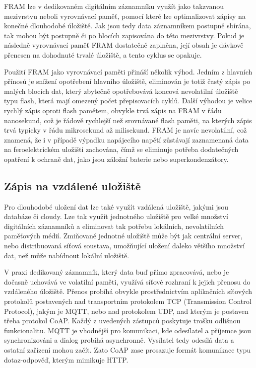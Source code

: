 FRAM lze v dedikovaném digitálním záznamníku využít jako takzvanou mezivrstvu neboli vyrovnávací paměť, pomocí které lze optimalizovat zápisy na konečné dlouhodobé úložiště. Jak jsou tedy data záznamníkem postupně sbírána, tak mohou být postupně či po blocích zapisována do této mezivrstvy. Pokud je následně vyrovnávací paměť FRAM dostatečně zaplněna, její obsah je dávkově přenesen na dohodnuté trvalé úložiště, a tento cyklus se opakuje. 


Použití FRAM jako vyrovnávací paměti přináší několik výhod. Jedním z hlavních přínosů je snížení opotřebení hlavního úložiště, eliminován je totiž častý zápis po malých blocích dat, který zbytečně opotřebovává koncová nevolatilní úložiště typu flash, která mají omezený počet přepisovacích cyklů. Další výhodou je velice rychlý zápis oproti flash pamětem, obvykle trvá zápis na FRAM v řádu nanosekund, což je řádově rychlejší než srovnávané flash paměti, na kterých zápis trvá typicky v řádu mikrosekund až milisekund. FRAM je navíc nevolatilní, což znamená, že i v případě výpadku napájecího napětí zůstávají zaznamenaná data na feroelektrickém uložišti zachována, čímž se eliminuje potřeba dodatečných opatření k ochraně dat, jako jsou záložní baterie nebo superkondenzátory.

\subsection{Zápis na vzdálené uložiště}
\label{zapis_na_vzdalene_uloziste}
Pro dlouhodobé uložení dat lze také využít vzdálená uložiště, jakými jsou databáze či cloudy. Lze tak využít jednotného uložiště pro velké množství digitálních záznamníků a eliminovat tak potřebu lokálních, nevolatilních paměťových médií. Zmiňované jednotné uložiště může být jak centrální server, nebo distribuovaná síťová soustava, umožňující uložení daleko většího množství dat, než může nabídnout lokální uložiště.

V praxi dedikovaný záznamník, který data buď přímo zpracovává, nebo je dočasně uchovává ve volatilní paměti, využívá síťové rozhraní k jejich přenosu do vzdáleného úložiště. Přenos probíhá obvykle prostřednictvím aplikačních síťových protokolů postavených nad transportním protokolem TCP (Transmission Control Protocol), jakým je MQTT, nebo nad protokolem UDP, nad kterým je postaven třeba protokol CoAP. Každý z uvedených zástupců poskytuje trošku odlišnou funkcionalitu. MQTT je vhodnější pro komunikaci, kde odesílatel a příjemce jsou synchronizováni a dialog probíhá asynchronně. Vysílatel tedy odesílá data a ostatní zařízení mohou začít. Zato CoAP zase prosazuje formát komunikace typu dotaz-odpověď, kterým mimikuje HTTP. \cite{emq_mqtt_vs_coap}


